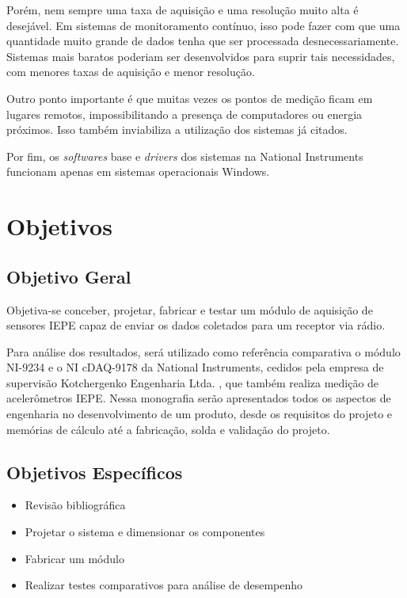 \documentclass[
	12pt,				%
	openright,			%
	twoside,			%
	a4paper,			%
	english,			%
	french,				%
	spanish,			%
	brazil,				%
	]{abntex2}
\begin{document}
		Porém, nem sempre uma taxa de aquisição e uma resolução muito alta é desejável. Em sistemas de monitoramento contínuo, isso pode fazer com que uma quantidade muito grande de dados tenha que ser processada desnecessariamente. Sistemas mais baratos poderiam ser desenvolvidos para suprir tais necessidades, com menores taxas de aquisição e menor resolução.

		Outro ponto importante é que muitas vezes os pontos de medição ficam em lugares remotos, impossibilitando a presença de computadores ou energia próximos. Isso também inviabiliza a utilização dos sistemas já citados.

		Por fim, os \textit{softwares} base e \textit{drivers} dos sistemas na National Instruments funcionam apenas em sistemas operacionais Windows.
	\section{Objetivos}

		\subsection{Objetivo Geral}
			Objetiva-se conceber, projetar, fabricar e testar um módulo de aquisição de sensores IEPE capaz de enviar os dados coletados para um receptor via rádio.

			Para análise dos resultados, será utilizado como referência comparativa o módulo NI-9234 e o NI cDAQ-9178 da National Instruments, cedidos pela empresa de supervisão Kotchergenko Engenharia Ltda. \cite{kot}, que também realiza medição de acelerômetros IEPE. Nessa monografia serão apresentados todos os aspectos de engenharia no desenvolvimento de um produto, desde os requisitos do projeto e memórias de cálculo até a fabricação, solda e validação do projeto.

		\subsection{Objetivos Específicos}
			\begin{itemize}
				\item Revisão bibliográfica
				\item Projetar o sistema e dimensionar os componentes
				\item Fabricar um módulo
				\item Realizar testes comparativos para análise de desempenho
			\end{itemize}
\end{document}
